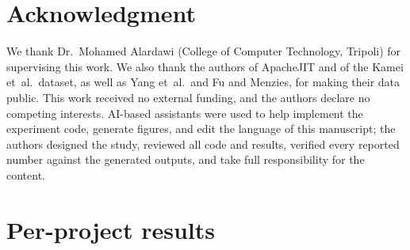 \section*{Acknowledgment}

\noindent We thank Dr.\ Mohamed Alardawi (College of Computer Technology, Tripoli) for supervising this work. We also thank the authors of ApacheJIT and of the Kamei et~al.\ dataset, as well as Yang et~al.\ and Fu and Menzies, for making their data public. This work received no external funding, and the authors declare no competing interests. AI-based assistants were used to help implement the experiment code, generate figures, and edit the language of this manuscript; the authors designed the study, reviewed all code and results, verified every reported number against the generated outputs, and take full responsibility for the content.




\appendix
\section{Per-project results}\label{app:perproject}

